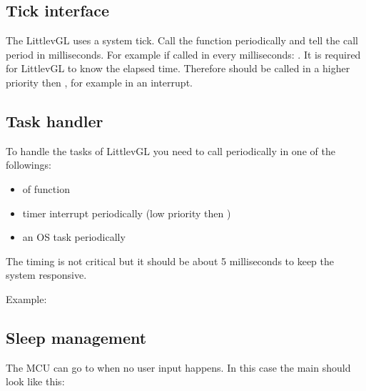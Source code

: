 \documentclass[letterpaper,10pt,english]{sphinxmanual}
\begin{document}
\subsection{Tick interface}
\label{\detokenize{porting/tick::doc}}\label{\detokenize{porting/tick:tick-interface}}
The LittlevGL uses a system tick. Call the  function periodically and tell the call period in milliseconds. For example if called in every milliseconds: .
It is required for LittlevGL to know the elapsed time. Therefore  should be called in a higher priority then , for example in an interrupt.


\subsection{Task handler}
\label{\detokenize{porting/task-handler::doc}}\label{\detokenize{porting/task-handler:task-handler}}
To handle the tasks of LittlevGL you need to call  periodically in one of the followings:
\begin{itemize}
\item {} 
 of  function

\item {} 
timer interrupt periodically (low priority then )

\item {} 
an OS task periodically

\end{itemize}

The timing is not critical but it should be about 5 milliseconds to keep the system responsive.

Example:

%
\begin{sphinxVerbatim}[commandchars=\\\{\}]
 
\end{sphinxVerbatim}


\subsection{Sleep management}
\label{\detokenize{porting/sleep::doc}}\label{\detokenize{porting/sleep:sleep-management}}
The MCU can go to  when no user input happens. In this case the main  should look like this:
\end{document}
